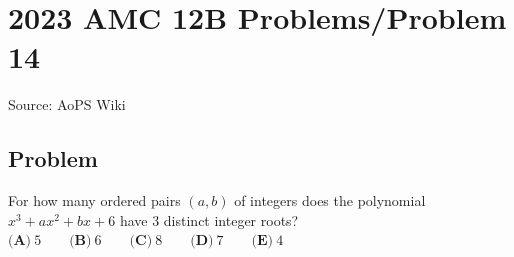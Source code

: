 \documentclass[12pt]{article}
\begin{document}
\section*{{2023 AMC 12B Problems/Problem 14}}
Source: AoPS Wiki

\subsection*{Problem}
For how many ordered pairs $(a,b)$ of integers does the polynomial $x^3+ax^2+bx+6$ have $3$ distinct integer roots? $\textbf{(A)}\ 5 \qquad\textbf{(B)}\ 6 \qquad\textbf{(C)}\ 8 \qquad\textbf{(D)}\ 7 \qquad\textbf{(E)}\ 4$
\end{document}
